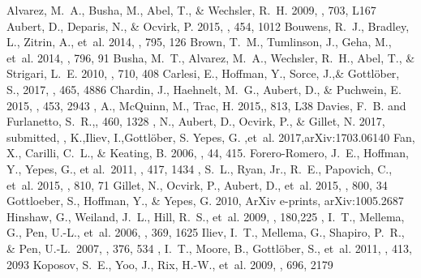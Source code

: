 \documentclass[twocolumn]{aastex61}
\begin{document}
\begin{thebibliography}{}

 Alvarez, M.~A., Busha, M., Abel, T., \& Wechsler, R.~H. 2009, \apjl,
  703, L167
 Aubert, D., Deparis, N., \& Ocvirk, P. 2015, \mnras, 454, 1012
 {Bouwens}, R.~J., {Bradley}, L., {Zitrin}, A., {et~al.} 2014, \apj, 795, 126
 {Brown}, T.~M., {Tumlinson}, J., {Geha}, M., {et~al.} 2014, \apj, 796, 91
 {Busha}, M.~T., {Alvarez}, M.~A., {Wechsler}, R.~H., {Abel}, T., \& {Strigari}, L.~E. 2010, \apj, 710, 408
 {Carlesi}, E., {Hoffman}, Y., {Sorce}, J.,\& {Gottlöber}, S., 2017, \mnras, 465, 4886
 {Chardin}, J., {Haehnelt}, M.~G., {Aubert}, D., \& {Puchwein}, E. 2015, \mnras, 453, 2943
, A., {McQuinn}, M., {Trac}, H. 2015,\apjl, 813, L38
 {Davies}, F.~B. and {Furlanetto}, S.~R.,\mnras, 460, 1328
, N., {Aubert}, D., {Ocvirk}, P., \& {Gillet}, N. 2017, submitted,
, K.,{Iliev}, I.,{Gottl{\"o}ber}, S.
	{Yepes}, G. ,{et~al.} 2017,arXiv:1703.06140
 Fan, X., Carilli, C.~L., \& Keating, B. 2006, \araa, 44, 415.
 Forero-Romero, J.~E., Hoffman, Y., Yepes, G., et al.\ 2011, \mnras, 417, 1434 
, S.~L., {Ryan}, Jr., R.~E., {Papovich}, C., {et~al.} 2015, \apj, 810, 71
 {Gillet}, N., {Ocvirk}, P., {Aubert}, D., {et~al.} 2015, \apj, 800, 34
 {Gottloeber}, S., {Hoffman}, Y., \& {Yepes}, G. 2010, ArXiv e-prints, arXiv:1005.2687
 {Hinshaw}, G., {Weiland}, J.~L., {Hill}, R.~S., {et~al.} 2009, \apjs, 180,225
, I.~T., {Mellema}, G., {Pen}, U.-L., {et~al.} 2006, \mnras, 369, 1625
 Iliev, I.~T., Mellema, G., Shapiro, P.~R., \& Pen, U.-L.\ 2007, \mnras, 376, 534
, I.~T., {Moore}, B., {Gottl{\"o}ber}, S., {et~al.} 2011, \mnras, 413,
  2093
 {Koposov}, S.~E., {Yoo}, J., {Rix}, H.-W., {et~al.} 2009, \apj, 696, 2179

\end{thebibliography}
\end{document}
